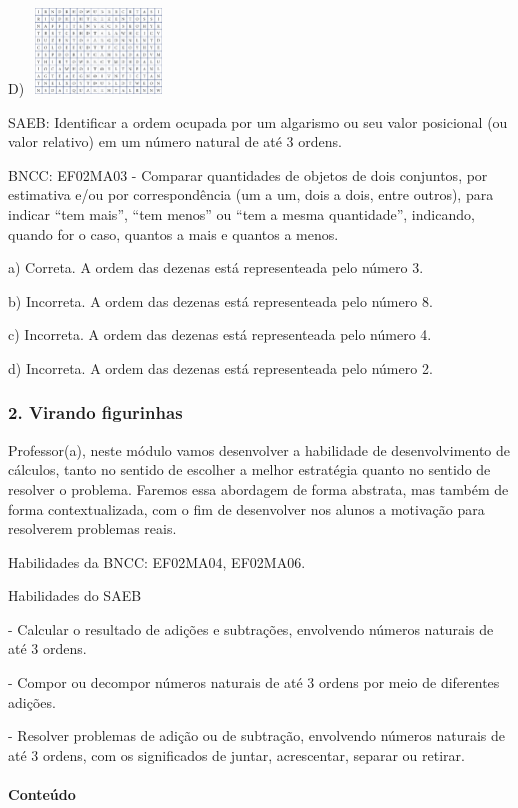 D) \includegraphics[width=1.45702in,height=0.89583in]{media/image27.png}

SAEB: Identificar a ordem ocupada por um algarismo ou seu valor posicional (ou valor relativo) em um número natural de até 3 ordens.

BNCC: EF02MA03 - Comparar quantidades de objetos de dois conjuntos, por estimativa e/ou por correspondência (um a um, dois a dois, entre outros), para indicar ``tem mais'', ``tem menos'' ou ``tem a mesma quantidade'', indicando, quando for o caso, quantos a mais e quantos a menos.

a) Correta. A ordem das dezenas está representeada pelo número 3.

b) Incorreta. A ordem das dezenas está representeada pelo número 8.

c) Incorreta. A ordem das dezenas está representeada pelo número 4.

d) Incorreta. A ordem das dezenas está representeada pelo número 2.

\subsubsection{2. Virando figurinhas}\label{muxf3dulo-2-batendo-tapuxe3o}

Professor(a), neste módulo vamos desenvolver a habilidade de desenvolvimento de cálculos, tanto no sentido de escolher a melhor
estratégia quanto no sentido de resolver o problema. Faremos essa
abordagem de forma abstrata, mas também de forma contextualizada, com o
fim de desenvolver nos alunos a motivação para resolverem problemas
reais. 

Habilidades da BNCC: EF02MA04, EF02MA06.

Habilidades do SAEB

- Calcular o resultado de adições e subtrações, envolvendo números naturais de até 3 ordens.

- Compor ou decompor números naturais de até 3 ordens por meio de diferentes adições.

- Resolver problemas de adição ou de subtração, envolvendo números
naturais de até 3 ordens, com os significados de juntar, acrescentar, separar ou retirar.

\paragraph{Conteúdo}\label{conteuxfado-1}

